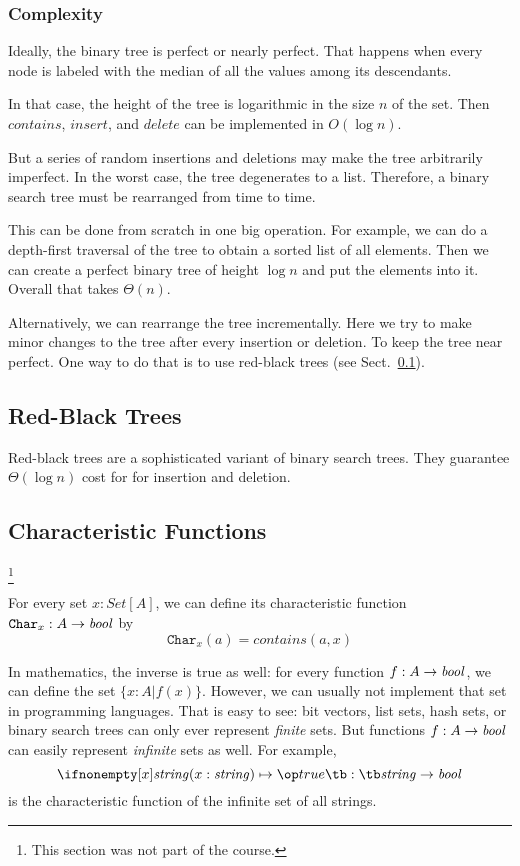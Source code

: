 \subsubsection{Complexity}

Ideally, the binary tree is perfect or nearly perfect.
That happens when every node is labeled with the median of all the values among its descendants.

In that case, the height of the tree is logarithmic in the size $n$ of the set.
Then $contains$, $insert$, and $delete$ can be implemented in $O(\log n)$.
\medskip

But a series of random insertions and deletions may make the tree arbitrarily imperfect.
In the worst case, the tree degenerates to a list.
Therefore, a binary search tree must be rearranged from time to time.

This can be done from scratch in one big operation.
For example, we can do a depth-first traversal of the tree to obtain a sorted list of all elements.
Then we can create a perfect binary tree of height $\log n$ and put the elements into it.
Overall that takes $\Theta(n)$.

Alternatively, we can rearrange the tree incrementally.
Here we try to make minor changes to the tree after every insertion or deletion.
To keep the tree near perfect.
One way to do that is to use red-black trees (see Sect.~\ref{sec:ad:redblacktree}).

\subsection{Red-Black Trees}\label{sec:ad:redblacktree}

Red-black trees are a sophisticated variant of binary search trees.
They guarantee $\Theta(\log n)$ cost for for insertion and deletion.

\subsection{Characteristic Functions}\label{sec:ad:charfun}

\footnote{This section was not part of the course.}

For every set $x:Set[A]$, we can define its characteristic function $\mathtt{Char}_x:A\to\mathit{bool}$ by
\[\mathtt{Char}_x(a) = contains(a,x)\]

In mathematics, the inverse is true as well: for every function $f:A\to \mathit{bool}$, we can define the set $\{x: A|f(x)\}$.
However, we can usually not implement that set in programming languages.
That is easy to see: bit vectors, list sets, hash sets, or binary search trees can only ever represent \emph{finite} sets.
But functions $f:A\to\mathit{bool}$ can easily represent \emph{infinite} sets as well.
For example, \[\alam[\String]{x}{\true}\tb:\tb\String\to \Bool\] is the characteristic function of the infinite set of all strings.

